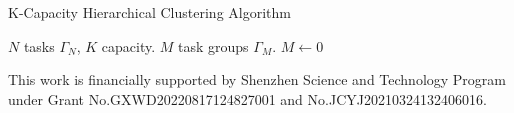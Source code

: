 \documentclass[sigconf,anonymous]{aamas}
\begin{document}
\begin{algorithm}[ht]
\caption{K-Capacity Hierarchical Clustering Algorithm}
\label{alg:KCHC}
\begin{algorithmic}
\REQUIRE $N$ tasks $\Gamma_{N}$, $K$ capacity.
\ENSURE $M$ task groups $\Gamma_{M}$.
\STATE $M \leftarrow 0$
\end{algorithmic}
\end{algorithm}




\begin{acks}
  This work is financially supported by Shenzhen Science and Technology Program 
  under Grant No.GXWD20220817124827001 and No.JCYJ20210324132406016.
\end{acks}



 


\end{document}
